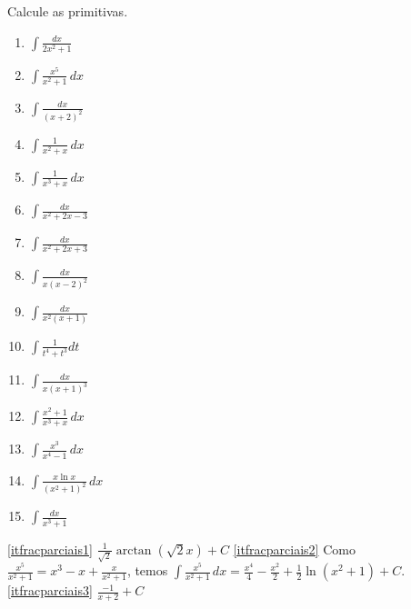 \begin{exo}\label{Exo:PrimitivasDecomposicao}
Calcule as primitivas.
\begin{multicols}{4}
\begin{enumerate}
\item\label{itfracparciais1} $\int \frac{dx}{2x^2+1}$
\item\label{itfracparciais2} $\int\frac{x^5}{x^2+1}\,dx$
\item\label{itfracparciais3} $\int\frac{dx}{(x+2)^2}$ 
\item\label{itfracparciais30} $\int\frac{1}{x^2+x}\,dx$
\item\label{itfracparciais31} $\int\frac{1}{x^3+x}\,dx$
\item\label{itfracparciais4} $\int\frac{dx}{x^2+2x-3}$
\item\label{itfracparciais5} $\int\frac{dx}{x^2+2x+3}$
\item\label{itfracparciais50} $\int\frac{dx}{x(x-2)^2}$ 
\item\label{itfracparciais51} $\int\frac{dx}{x^2(x+1)}$
\item\label{itfracparciais7} $\int\frac{1}{t^4+t^3}dt$
\item\label{itfracparciais52} $\int\frac{dx}{x(x+1)^3}$
\item\label{itfracparciais9} $\int \frac{x^2+1}{x^3+x}\,dx$
\item\label{itfracparciais10} $\int \frac{x^3}{x^4-1}\,dx$
\item\label{itfracparciais104} $\int \frac{x\ln x}{(x^2+1)^2}\,dx$
\item\label{itfracparciais6} $\int\frac{dx}{x^3+1}$
\end{enumerate}
\end{multicols}
\vspace{0.01cm}
\begin{sol}
\eqref{itfracparciais1} $\tfrac{1}{\sqrt{2}}\arctan(\sqrt{2}x)+C$
\eqref{itfracparciais2} Como $\frac{x^5}{x^2+1}=x^3-x+\frac{x}{x^2+1}$, temos
$\int\frac{x^5}{x^2+1}\,dx=\tfrac{x^4}{4}-\tfrac{x^2}{2}+\tfrac12\ln (x^2+1)+C$.
\eqref{itfracparciais3} $\frac{-1}{x+2}+C$


\end{sol}
\end{exo}
